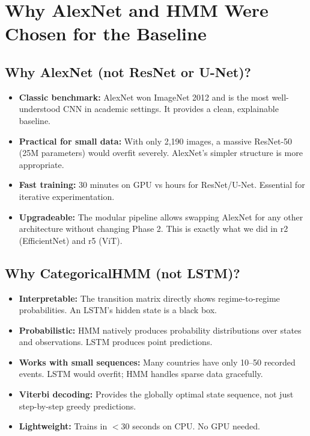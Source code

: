 \documentclass[11pt]{article}
\begin{document}
\section{Why AlexNet and HMM Were Chosen for the Baseline}

\subsection{Why AlexNet (not ResNet or U-Net)?}
\begin{itemize}[nosep]
    \item \textbf{Classic benchmark:} AlexNet won ImageNet 2012 and is the most well-understood CNN in academic settings. It provides a clean, explainable baseline.
    \item \textbf{Practical for small data:} With only 2,190 images, a massive ResNet-50 (25M parameters) would overfit severely. AlexNet's simpler structure is more appropriate.
    \item \textbf{Fast training:} 30 minutes on GPU vs hours for ResNet/U-Net. Essential for iterative experimentation.
    \item \textbf{Upgradeable:} The modular pipeline allows swapping AlexNet for any other architecture without changing Phase 2. This is exactly what we did in r2 (EfficientNet) and r5 (ViT).
\end{itemize}

\subsection{Why CategoricalHMM (not LSTM)?}
\begin{itemize}[nosep]
    \item \textbf{Interpretable:} The transition matrix directly shows regime-to-regime probabilities. An LSTM's hidden state is a black box.
    \item \textbf{Probabilistic:} HMM natively produces probability distributions over states and observations. LSTM produces point predictions.
    \item \textbf{Works with small sequences:} Many countries have only 10--50 recorded events. LSTM would overfit; HMM handles sparse data gracefully.
    \item \textbf{Viterbi decoding:} Provides the globally optimal state sequence, not just step-by-step greedy predictions.
    \item \textbf{Lightweight:} Trains in $<$30 seconds on CPU. No GPU needed.
\end{itemize}
\end{document}
